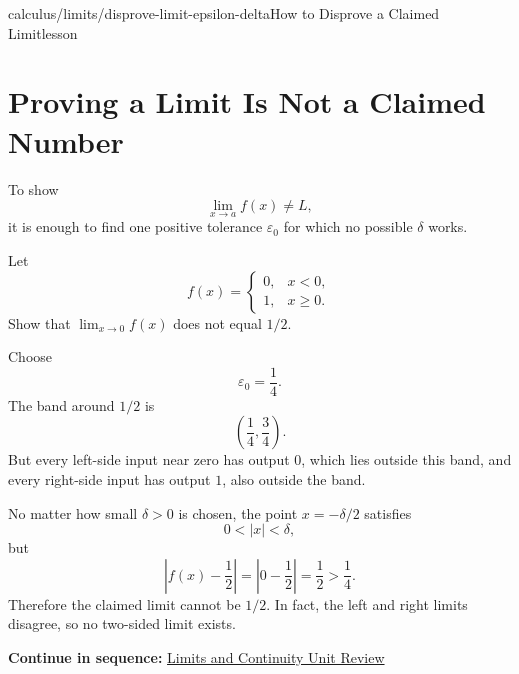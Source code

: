 \documentclass[11pt,openany]{book}
\theoremstyle{bgplain}
\newcounter{bgexample}[chapter]
\newcommand{\webnext}[2]{%
  \par\addvspace{1.2em}\noindent{\color{BGLine}\rule{\textwidth}{0.35pt}}\par\smallskip
  {\small\color{BGGray}\textbf{Continue in sequence:} \hyperlink{web:#1}{#2}}\par
}
\newcommand{\eps}{\varepsilon}
\begin{document}
\begin{webpage}{calculus/limits/disprove-limit-epsilon-delta}{How to Disprove a Claimed Limit}{lesson}
\section{Proving a Limit Is Not a Claimed Number}

To show
\[
  \lim_{x\to a}f(x)\ne L,
\]
it is enough to find one positive tolerance \(\eps_0\) for which no possible \(\delta\) works.

\begin{bgexample}[title={A jump fails the formal definition}]
Let
\[
  f(x)=
  \begin{cases}
    0,&x<0,\\
    1,&x\ge0.
  \end{cases}
\]
Show that \(\lim_{x\to0}f(x)\) does not equal \(1/2\).

\begin{bgsolution}
Choose
\[
  \eps_0=\frac14.
\]
The band around \(1/2\) is
\[
  \left(\frac14,\frac34\right).
\]
But every left-side input near zero has output \(0\), which lies outside this band, and every right-side input has output \(1\), also outside the band.

No matter how small \(\delta>0\) is chosen, the point \(x=-\delta/2\) satisfies
\[
  0<|x|<\delta,
\]
but
\[
  \left|f(x)-\frac12\right|
  =\left|0-\frac12\right|
  =\frac12
  >\frac14.
\]
Therefore the claimed limit cannot be \(1/2\). In fact, the left and right limits disagree, so no two-sided limit exists.
\end{bgsolution}
\end{bgexample}
\webnext{calculus/limits/unit-review}{Limits and Continuity Unit Review}
\end{webpage}
\end{document}
